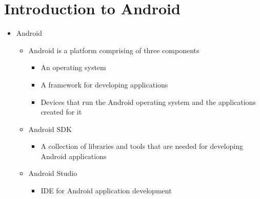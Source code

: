 %
%
%
\section{Introduction to Android}
\begin{itemize}
	\item Android
	\begin{itemize}
		\item Android is a platform comprising of three components
		\begin{itemize}
			\item An operating system
			\item A framework for developing applications
			\item Devices that run the Android operating system and the applications created
			for it
		\end{itemize}
		\item Android SDK
		\begin{itemize}
			\item A collection of libraries and tools that are needed for developing Android applications
		\end{itemize}
		\item Android Studio
		\begin{itemize}
			\item IDE for Android application development
		\end{itemize}
	\end{itemize}


\end{itemize}
